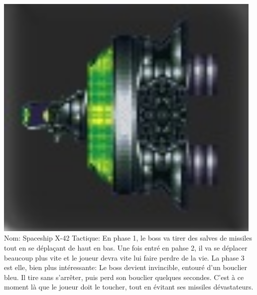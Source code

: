 	\par \includegraphics[width=13cm]{images/boss1.jpg}   Nom: Spaceship X-42
               Tactique: En phase 1, le boss va tirer des salves de missiles tout en se déplaçant de haut en bas. Une fois entré en pahse 2, il va se déplacer beaucoup plus vite et le joueur devra vite lui faire perdre de la vie. La phase 3 est elle, bien plus intéressante: Le boss devient invincible, entouré d'un bouclier bleu. Il tire sans s'arrêter, puis perd son bouclier quelques secondes. C'est à ce moment là que le joueur doit le toucher, tout en évitant ses missiles dévastateurs.
			   
